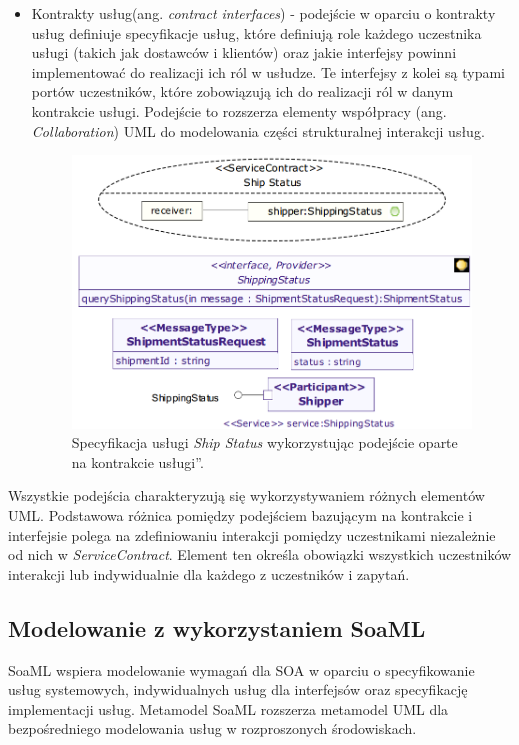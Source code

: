 \begin{itemize}
\item{Kontrakty usług(ang. \emph{contract interfaces}) - podejście w oparciu o kontrakty usług definiuje specyfikacje usług, które definiują role każdego uczestnika usługi (takich jak dostawców i klientów) oraz jakie interfejsy powinni implementować do realizacji ich ról w usłudze. Te interfejsy z kolei są typami portów uczestników, które zobowiązują ich do realizacji ról w danym kontrakcie usługi. Podejście to rozszerza elementy współpracy (ang. \emph{Collaboration}) UML do modelowania części strukturalnej interakcji usług. 
\begin{figure}[h!tbp]
\begin{centering}
\includegraphics[width=11cm]{img/service_contract_based_approach.png}
\caption[Specyfikacja usługi \emph{Ship Status} wykorzystując podejście oparte na \quotedblbase kontrakcie usługi\textquotedblright. ]{Specyfikacja usługi \emph{Ship Status} wykorzystując podejście oparte na \quotedblbase kontrakcie usługi\textquotedblright.\cite{SoaMLErvBase}}\label{service_contract_based_approach}
\end{centering}
\end{figure}
}
\end{itemize}

Wszystkie podejścia charakteryzują się wykorzystywaniem różnych elementów UML. Podstawowa różnica pomiędzy podejściem bazującym na kontrakcie i interfejsie polega na zdefiniowaniu interakcji pomiędzy uczestnikami niezależnie od nich w \emph{ServiceContract}. Element ten określa obowiązki wszystkich uczestników interakcji lub indywidualnie dla każdego z uczestników i zapytań. 

\subsection{Modelowanie z wykorzystaniem SoaML}
SoaML wspiera modelowanie wymagań dla SOA w oparciu o specyfikowanie usług systemowych, indywidualnych usług dla interfejsów oraz specyfikację implementacji usług. Metamodel SoaML\cite{soaml_metamodel} rozszerza metamodel UML dla bezpośredniego modelowania usług w rozproszonych środowiskach. \cite{SoaMLErvBase}


